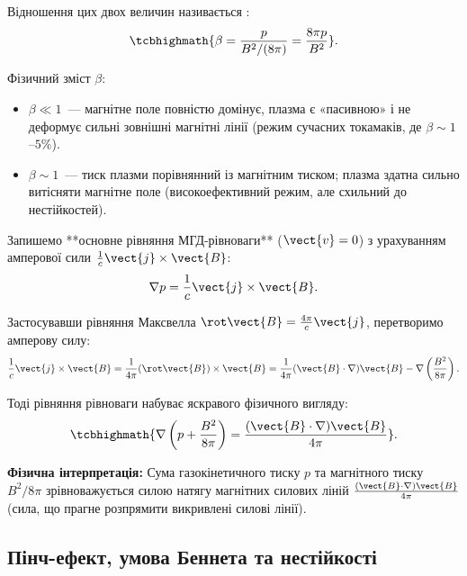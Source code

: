Відношення цих двох величин називається :
\begin{equation}
	\tcbhighmath{\beta = \frac{p}{B^2 / (8\pi)} = \frac{8\pi p}{B^2}}.
\end{equation}

Фізичний зміст $\beta$:
\begin{itemize}
	\item $\beta \ll 1$~--- магнітне поле повністю домінує, плазма є «пасивною» і не деформує сильні зовнішні магнітні лінії (режим сучасних токамаків, де $\beta \sim 1$--$5\%$).
	\item $\beta \sim 1$~--- тиск плазми порівнянний із магнітним тиском; плазма здатна сильно витісняти магнітне поле (високоефективний режим, але схильний до нестійкостей).
\end{itemize}

Запишемо **основне рівняння МГД-рівноваги** ($\vect{v} = 0$) з урахуванням амперової сили $\frac{1}{c}\vect{j}\times\vect{B}$:
\begin{equation}
	\nabla p = \frac{1}{c}\vect{j}\times\vect{B}.
\end{equation}

Застосувавши рівняння Максвелла $\rot\vect{B} = \frac{4\pi}{c}\vect{j}$, перетворимо амперову силу:
\begin{equation}
	\frac{1}{c}\vect{j}\times\vect{B} = \frac{1}{4\pi}(\rot\vect{B})\times\vect{B} = \frac{1}{4\pi}(\vect{B}\cdot\nabla)\vect{B} - \nabla\left(\frac{B^2}{8\pi}\right).
\end{equation}

Тоді рівняння рівноваги набуває яскравого фізичного вигляду:
\begin{equation}
	\tcbhighmath{\nabla \left(p + \frac{B^2}{8\pi}\right) = \frac{(\vect{B}\cdot\nabla)\vect{B}}{4\pi}}.
\end{equation}

\textbf{Фізична інтерпретація:}
Сума газокінетичного тиску $p$ та магнітного тиску $B^2/8\pi$ зрівноважується силою натягу магнітних силових ліній $\frac{(\vect{B}\cdot\nabla)\vect{B}}{4\pi}$ (сила, що прагне розпрямити викривлені силові лінії).

\subsection{Пінч-ефект, умова Беннета та нестійкості}

